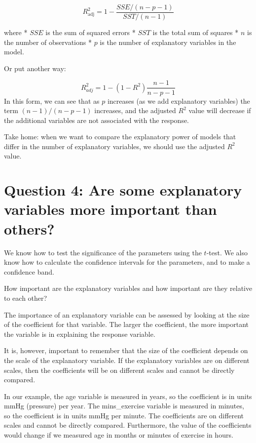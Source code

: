 \documentclass[
  letterpaper,
  8pt,
  a4paper]{book}
\begin{document}
\[R^2_{\text{adj}} = 1 - \frac{SSE / (n - p - 1)}{SST / (n - 1)}\]

where * \(SSE\) is the sum of squared errors * \(SST\) is the total sum
of squares * \(n\) is the number of observations * \(p\) is the number
of explanatory variables in the model.

Or put another way:

\[R^2_{adj} = 1-(1-R^2 )\frac{n-1}{n-p-1}\] In this form, we can see
that as \(p\) increases (as we add explanatory variables) the term
\((n-1)/(n-p-1)\) increases, and the adjusted \(R^2\) value will
decrease if the additional variables are not associated with the
response.

Take home: when we want to compare the explanatory power of models that
differ in the number of explanatory variables, we should use the
adjusted \(R^2\) value.

\section*{Question 4: Are some explanatory variables more important than
others?}\label{question-4-are-some-explanatory-variables-more-important-than-others}


We know how to test the significance of the parameters using the
\(t\)-test. We also know how to calculate the confidence intervals for
the parameters, and to make a confidence band.

How important are the explanatory variables and how important are they
relative to each other?

The importance of an explanatory variable can be assessed by looking at
the size of the coefficient for that variable. The larger the
coefficient, the more important the variable is in explaining the
response variable.

It is, however, important to remember that the size of the coefficient
depends on the scale of the explanatory variable. If the explanatory
variables are on different scales, then the coefficients will be on
different scales and cannot be directly compared.

In our example, the age variable is measured in years, so the
coefficient is in units mmHg (pressure) per year. The mins\_exercise
variable is measured in minutes, so the coefficient is in units mmHg per
minute. The coefficients are on different scales and cannot be directly
compared. Furthermore, the value of the coefficients would change if we
measured age in months or minutes of exercise in hours.
\end{document}
